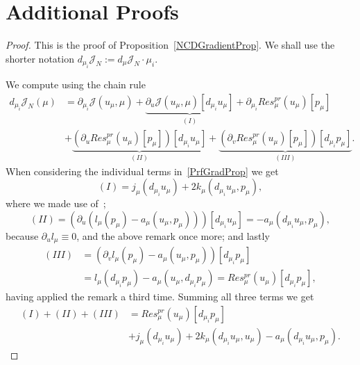 \appendix

\section{Additional Proofs}\label{sec:Appendix}

\begin{proof}
    This is the proof of Proposition~\ref{NCDGradientProp}. We shall use the shorter notation $d_{\mu_i} \mathcal{J}_N := d_\mu \mathcal{J}_N \cdot \mu_i$.

    We compute using the chain rule
    \begin{align}
        d_{\mu_i} \mathcal{J}_N(\mu) &= \partial_{\mu_i} \mathcal{J}(u_\mu, \mu) + \underbrace{\partial_u \mathcal{J}(u_\mu, \mu)[d_{\mu_i} u_\mu]}_{(I)} + \partial_{\mu_i} Res_\mu^{pr}(u_\mu)[p_\mu] \label{PrfGradProp}\\
        &+ \underbrace{\left( \partial_u Res_\mu^{pr}(u_\mu)[p_\mu] \right)[d_{\mu_i} u_\mu]}_{(II)} + \underbrace{\left( \partial_v Res_\mu^{pr}(u_\mu)[p_\mu] \right)[d_{\mu_i} p_\mu]}_{(III)}. \nonumber
    \end{align}
    When considering the individual terms in~\eqref{PrfGradProp} we get
    \begin{equation*}
        (I) = j_\mu(d_{\mu_i} u_\mu) + 2 k_\mu(d_{\mu_i} u_\mu, p_\mu),
    \end{equation*}
    where we made use of~\cite[Remark 2.4]{Keil2021};
    \begin{equation*}
        (II) = \left( \partial_u (l_\mu(p_\mu) - a_\mu(u_\mu, p_\mu)) \right)[d_{\mu_i} u_\mu] = -a_\mu(d_{\mu_i} u_\mu, p_\mu),
    \end{equation*}
    because $\partial_u l_\mu \equiv 0$, and the above remark once more; and lastly
    \begin{align*}
        (III) &= \left( \partial_v l_\mu(p_\mu) - a_\mu(u_\mu, p_\mu) \right)[d_{\mu_i} p_\mu] \\
        &= l_\mu(d_{\mu_i} p_\mu) - a_\mu(u_\mu, d_{\mu_i} p_\mu) = Res_\mu^{pr}(u_\mu)[d_{\mu_i} p_\mu],
    \end{align*}
    having applied the remark a third time.
    Summing all three terms we get
    \begin{align}
        (I) + (II) + (III) &= Res_\mu^{pr}(u_\mu)[d_{\mu_i} p_\mu] \label{PrfEq1}\\
        &+ j_\mu(d_{\mu_i} u_\mu) + 2 k_\mu(d_{\mu_i} u_\mu, u_\mu) - a_\mu(d_{\mu_i} u_\mu, p_\mu). \nonumber
    \end{align}


\end{proof}
